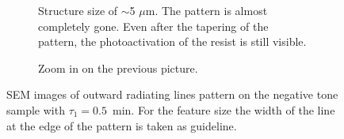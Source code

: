 \begin{figure}[htb]
\begin{subfigure}[t]{0.24\linewidth}
      	\label{fig:b2d23_q23}
    \end{subfigure}
    \hfill
    \begin{subfigure}[t]{0.24\linewidth}
      	\caption{Structure size of $\sim$5 $\mu$m. The pattern is almost completely gone. Even after the tapering of the pattern, the photoactivation of the resist is still visible.}
      	\label{fig:b2d24_q24}
    \end{subfigure}
    \hfill
    \begin{subfigure}[t]{0.24\linewidth}
      	\caption{Zoom in on the previous picture.}
      	\label{fig:b2d25_q25}
    \end{subfigure}
    \hfill
    \caption{SEM images of outward radiating lines pattern on the negative tone sample with $\tau_1 = 0.5$~min. For the feature size the width of the line at the edge of the pattern is taken as guideline.}
\end{figure}

